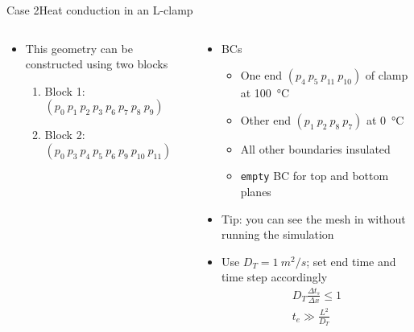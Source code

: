 \begin{frame}{Case 2}{Heat conduction in an L-clamp}
\begin{columns}
\begin{column}{0.5\linewidth}
\begin{figure}
            \end{figure}
            \begin{itemize}
                \item This geometry can be constructed using two blocks
                \begin{enumerate}
                    \item Block 1: $(p_0 ~ p_1 ~ p_2 ~ p_3 ~ p_6 ~ p_7 ~ p_8 ~ p_9)$
                    \item Block 2: $(p_0 ~ p_3 ~ p_4 ~ p_5 ~ p_6 ~ p_9 ~ p_{10} ~ p_{11})$
                \end{enumerate}
            \end{itemize}
        \end{column}
        \begin{column}{0.5\linewidth}
            \begin{itemize}
                \item BCs
                \begin{itemize}
                    \item One end $(p_4 ~ p_5 ~ p_{11} ~ p_{10})$ of clamp at \qty{100}{\degreeCelsius}
                    \item Other end $(p_1 ~ p_2 ~ p_8 ~ p_7)$ at \qty{0}{\degreeCelsius}
                    \item All other boundaries insulated
                    \item \texttt{empty} BC for top and bottom planes
                \end{itemize}
	            \item Tip: you can see the mesh in \paraview{} without running the simulation
                \item Use $D_T=\qty{1}{m^2/s}$; set end time and time step accordingly
                \begin{gather*}
                    D_T \frac{\Delta t_s}{\Delta x} \le 1\\
                    t_e \gg \frac{L^2}{D_T}
                \end{gather*}
            \end{itemize}
        \end{column}
    \end{columns}
\end{frame}

